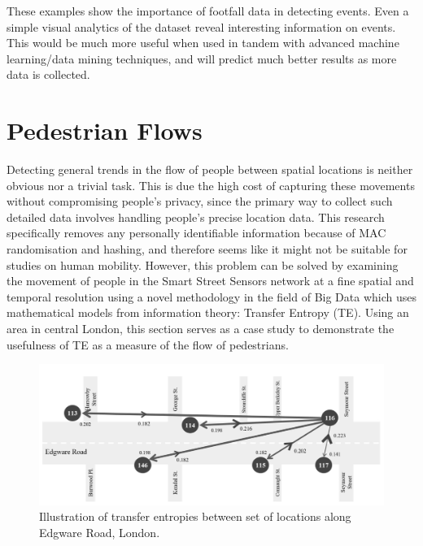 These examples show the importance of footfall data in detecting events. 
Even a simple visual analytics of the dataset reveal interesting information on events. 
This would be much more useful when used in tandem with advanced machine learning/data mining techniques, and will predict much better results as more data is collected.

\section{Pedestrian Flows}

Detecting general trends in the flow of people between spatial locations is neither obvious nor a trivial task. 
This is due the high cost of capturing these movements without compromising people’s privacy, since the primary way to collect such detailed data involves handling people’s precise location data. 
This research specifically removes any personally identifiable information because of MAC randomisation and hashing, and therefore seems like it might not be suitable for studies on human mobility. 
However, this problem can be solved by examining the movement of people in the Smart Street Sensors network at a fine spatial and temporal resolution using a novel methodology in the field of Big Data which uses mathematical models from information theory: Transfer Entropy (TE). 
Using an area in central London, this section serves as a case study to demonstrate the usefulness of TE as a measure of the flow of pedestrians.

\begin{figure}
  \includegraphics[trim={0 0 0 0},clip]{images/applications-transfer-entropy.png}
  \caption{Illustration of transfer entropies between set of locations along Edgware Road, London.}
  \label{figure:applications:transent}
\end{figure}


